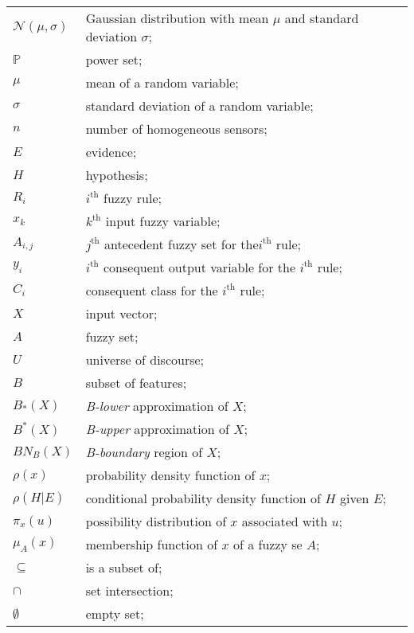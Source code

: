\begin{longtable}{ll}
	$\mathcal{N}(\mu,\sigma)$	& Gaussian distribution with mean $\mu$ and standard deviation $\sigma$; \\
	$\mathbb{P}$			& power set; \\
	
	$\mu$ 					& mean of a random variable; \\
	$\sigma$ 				& standard deviation of a random variable;\\
	
	$n$						& number of homogeneous sensors; \\
	$E$						& evidence; \\ 
	$H$						& hypothesis; \\
	$R_i$					& $i^{\textrm{th}}$ fuzzy rule; \\
	$x_k$					& $k^{\textrm{th}}$ input fuzzy variable; \\
	$A_{i,j}$				& $j^{\textrm{th}}$ antecedent fuzzy set for the$i^{\textrm{th}}$ rule; \\
	$y_i$					& $i^{\textrm{th}}$ consequent output variable for the $i^{\textrm{th}}$ rule; \\
	$C_i$					& consequent class for the $i^{\textrm{th}}$ rule; \\
	$X$						& input vector; \\
	$A$						& fuzzy set; \\
	$U$						& universe of discourse; \\
	$B$						& subset of features; \\
	$B_*(X)$				& \textit{B-lower} approximation of $X$; \\
	$B^*(X)$				& \textit{B-upper} approximation of $X$; \\
	$BN_B(X)$				& \textit{B-boundary} region of $X$; \\
	
	$\rho(x)$				& probability density function of $x$; \\
	$\rho(H|E)$				& conditional probability density function of $H$ given $E$; \\
	$\pi_x(u)$				& possibility distribution of $x$ associated with $u$; \\
	$\mu_A(x)$				& membership function of $x$ of a fuzzy se $A$; \\
	
	
	$\subseteq$				& is a subset of; \\
	$\cap$					& set intersection; \\
	$\emptyset$				& empty set; \\
	
\end{longtable}


